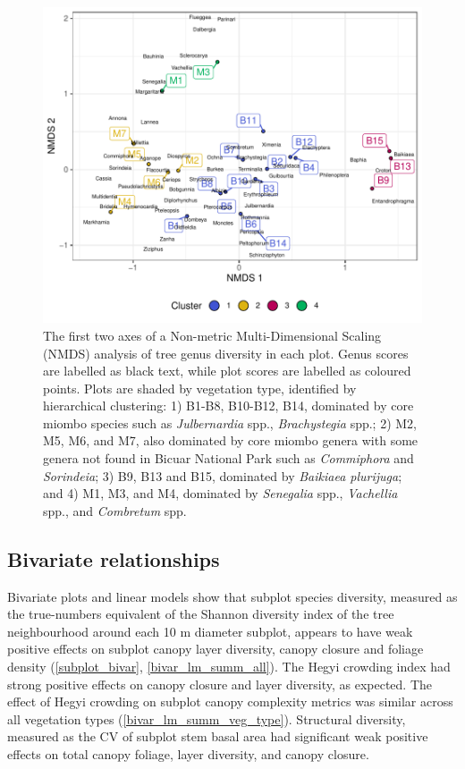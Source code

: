 \documentclass[11pt,a4paper]{article}
\begin{document}
\begin{figure}
	\includegraphics[width=\linewidth]{nmds}
	\caption[NMDS of plots based on genera basal area abundance]{The first two axes of a Non-metric Multi-Dimensional Scaling (NMDS) analysis of tree genus diversity in each plot. Genus scores are labelled as black text, while plot scores are labelled as coloured points. Plots are shaded by vegetation type, identified by hierarchical clustering: 1) B1-B8, B10-B12, B14, dominated by core miombo species such as \textit{Julbernardia} spp., \textit{Brachystegia} spp.; 2) M2, M5, M6, and M7, also dominated by core miombo genera with some genera not found in Bicuar National Park such as \textit{Commiphora} and \textit{Sorindeia}; 3) B9, B13 and B15, dominated by \textit{Baikiaea plurijuga}; and 4) M1, M3, and M4, dominated by \textit{Senegalia} spp., \textit{Vachellia} spp., and \textit{Combretum} spp.}
	\label{nmds}
\end{figure}

\subsection{Bivariate relationships}

Bivariate plots and linear models show that subplot species diversity, measured as the true-numbers equivalent of the Shannon diversity index of the tree neighbourhood around each 10 m diameter subplot, appears to have weak positive effects on subplot canopy layer diversity, canopy closure and foliage density (\autoref{subplot_bivar}, \autoref{bivar_lm_summ_all}). The Hegyi crowding index had strong positive effects on canopy closure and layer diversity, as expected. The effect of Hegyi crowding on subplot canopy complexity metrics was similar across all vegetation types (\autoref{bivar_lm_summ_veg_type}). Structural diversity, measured as the CV of subplot stem basal area had significant weak positive effects on total canopy foliage, layer diversity, and canopy closure. 
\end{document}
